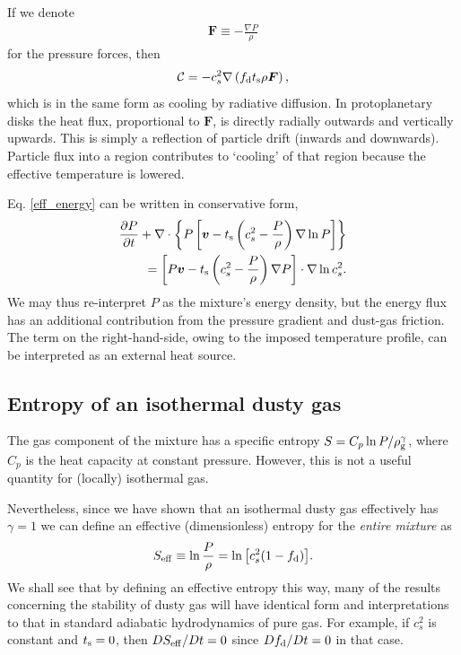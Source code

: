 If we denote 
\begin{align}
  \bm{F} \equiv  - \frac{\nabla P}{\rho}
\end{align}
for the pressure forces, then
\begin{align*}
  \mathcal{C} = - c_s^2\nabla \left( f_\mathrm{d} t_\mathrm{s} \rho \bm{F}
  \right), 
\end{align*}
which is in the same form as cooling by radiative diffusion. In protoplanetary
disks the heat flux, proportional to $\bm{F}$, is directly radially
outwards and vertically upwards. This is simply a reflection of
particle drift (inwards and downwards). Particle flux into a region contributes
to `cooling' of that region because the effective temperature is
lowered. 

Eq. \ref{eff_energy} can be written in conservative form,
\begin{align*}
  \frac{\partial P}{ \partial t} + \nabla\cdot\left\{P\left[\bm{v} -
      t_\mathrm{s}\left(c_s^2 - \frac{P}{\rho}\right)\nabla\ln{P}\right]
    \right\}\\
  = \left[P\bm{v} - t_\mathrm{s}\left(c_s^2 - \frac{P}{\rho}\right)\nabla
    P\right]\cdot\nabla\ln{c_s^2}. 
\end{align*} 
We may thus re-interpret $P$ as the mixture's energy density, but the
energy flux has an additional contribution from the pressure
gradient and dust-gas friction. The term on the right-hand-side, owing
to the imposed temperature profile, can be interpreted as an external
heat source.  


\subsection{Entropy of an isothermal dusty gas }

The gas component of the mixture has a specific entropy
$S = C_p\ln{P/\rho_\mathrm{g}^\gamma}$, where $C_p$ is the heat capacity at constant
pressure. However, this is not a useful quantity for (locally)
isothermal gas. 

Nevertheless, since we have shown that an isothermal dusty gas
effectively has $\gamma=1$ we can define an effective (dimensionless)  
entropy for the \emph{entire mixture} as 
\begin{align}
   S_\mathrm{eff} \equiv \ln \frac{P}{\rho} = \ln{\left[c_s^2(1-f_\mathrm{d})\right]}.  
\end{align} 
We shall see that by defining an effective entropy this way, many of the 
results concerning the stability of dusty gas will have identical form
and interpretations to that in standard adiabatic hydrodynamics of 
pure gas. For example, if $c_s^2$ is constant and $t_\mathrm{s}=0$, then
$DS_\mathrm{eff}/ D t = 0$ since $Df_\mathrm{d}/D t=0$ in that case.  

